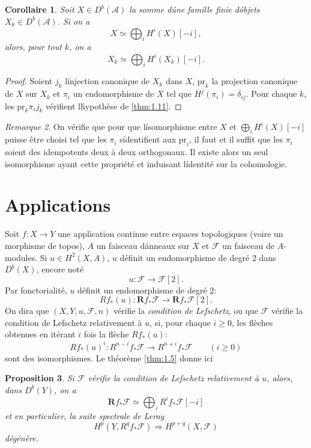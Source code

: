 \documentclass[12pt]{amsart}
\theoremstyle{plain}
\newtheorem{prop}{Proposition}[section]
\newtheorem{cor}[prop]{Corollaire}
\theoremstyle{remark}
\newtheorem{rem}[prop]{Remarque}
\newcommand{\cA}{\mathscr{A}}
\newcommand{\cF}{\mathscr{F}}
\newcommand{\Rf}{\mathbf{R}f_*}
\newcommand{\db}{D^b}
\newcommand{\pr}{\text{pr}}
\begin{document}
\begin{cor}\label{cor:1.12}
Soit $X \in \db(\cA)$ la somme d\'une famille finie d\'objets $X_k \in \db(\cA)$. Si on a
\[
X \simeq \bigoplus_i H^i(X)[-i],
\]
alors, pour tout $k$, on a
\[
X_k \simeq \bigoplus_i H^i(X_k)[-i].
\]
\end{cor}

\begin{proof}
Soient $j_k$ l\'injection canonique de $X_k$ dans $X$, $\pr_k$ la projection canonique de $X$ sur $X_k$ et $\pi_i$ un endomorphisme de $X$ tel que $H^j(\pi_i) = \delta_{ij}$. Pour chaque $k$, les $\pr_k \pi_i j_k$ v\'erifient l\'hypoth\`ese de \eqref{thm:1.11}.
\end{proof}

\begin{rem}\label{rem:1.13}
On v\'erifie que pour que l\'isomorphisme entre $X$ et $\bigoplus_i H^i(X)[-i]$ puisse \^etre choisi tel que les $\pi_i$ s\'identifient aux $\pr_i$, il faut et il suffit que les $\pi_i$ soient des idempotents deux \`a deux orthogonaux. Il existe alors un seul isomorphisme ayant cette propri\'et\'e et induisant l\'identit\'e sur la cohomologie.
\end{rem}


\section{Applications}

Soit $f : X \to Y$ une application continue entre espaces topologiques (voire un morphisme de topos), $A$ un faisceau d\'anneaux sur $X$ et $\cF$ un faisceau de $A$-modules. Si $u \in H^2(X, A)$, $u$ d\'efinit un endomorphisme de degr\'e $2$ dans $\db(X)$, encore not\'e
\[
u : \cF \longrightarrow \cF[2].
\]
Par fonctorialit\'e, $u$ d\'efinit un endomorphisme de degr\'e $2$:
\[
Rf_*(u) : \Rf\cF \longrightarrow \Rf\cF[2].
\]
On dira que $(X, Y, u, \cF, n)$ v\'erifie la \emph{condition de Lefschetz}, ou que $\cF$ v\'erifie la condition de Lefschetz relativement \`a $u$, si, pour chaque $i \geq 0$, les fl\`eches obtenues en it\'erant $i$ fois la fl\`eche $Rf_*(u)$:
\[
Rf_*(u)^i : R^{n-i}f_*\cF \longrightarrow R^{n+i}f_*\cF \qquad (i \geq 0)
\]
sont des isomorphismes. Le th\'eor\`eme \eqref{thm:1.5} donne ici

\begin{prop}\label{prop:2.1}
Si $\cF$ v\'erifie la condition de Lefschetz relativement \`a $u$, alors, dans $\db(Y)$, on a
\[
\Rf\cF \simeq \bigoplus_i R^if_*\cF[-i]
\]
et en particulier, la suite spectrale de Leray
\[
H^p(Y, R^qf_*\cF) \Rightarrow H^{p+q}(X, \cF)
\]
d\'eg\'en\`ere.
\end{prop}
\end{document}
